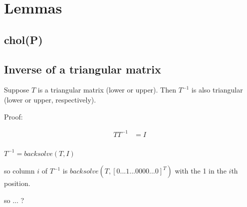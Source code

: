 \documentclass[english]{article}
\begin{document}
\section*{Lemmas}

\subsection*{chol(P)}

\subsection*{Inverse of a triangular matrix}

Suppose $T$ is a triangular matrix (lower or upper). Then $T^{-1}$ is also triangular (lower or upper, respectively).

Proof:


\begin{align*}
T T^{-1} &= I \\
\end{align*}


$T^{-1} = backsolve(T, I)$

so column $i$ of $T^{-1}$ is
 $backsolve(T, [0 ... 1 ... 0 0 0 0 ... 0]^T) $
 with the 1 in the $i$th position.

so ... ?
\end{document}
